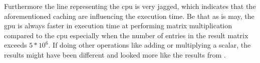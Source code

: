 Furthermore the line representing the \acrshort{cpu} is very jagged, which indicates that the aforementioned caching are influencing the execution time.
Be that as is may, the \acrshort{gpu} is always faster in execution time at performing matrix multiplication compared to the \acrshort{cpu} especially when the number of entries in the result matrix exceeds $5*10^6$.
If doing other operations like adding or multiplying a scalar, the results might have been different and looked more like the results from . 



